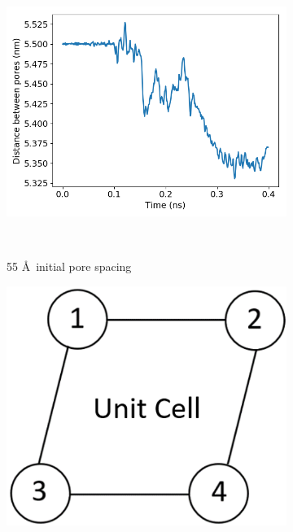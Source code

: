 \documentclass{article}
\begin{document}
\begin{figure}[!htb]
\begin{subfigure}{0.3\textwidth}
		\includegraphics[width=\textwidth]{p2p_55.png}
		\vspace{-1.25em}
		\caption{55 \AA~initial pore spacing}~\label{fig:p2p_55}
	\end{subfigure}
	\begin{subfigure}{0.3\textwidth}
	\includegraphics[width=\textwidth]{p2p_diagram.png}
	\caption{}~\label{fig:p2p_diagram}
  	\end{subfigure} 

\end{figure}
\end{document}
